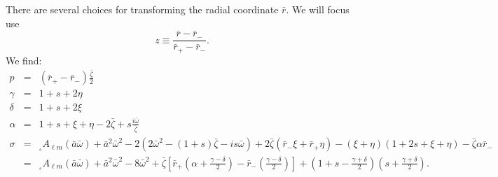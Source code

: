\documentclass[11pt]{article}
\newcommand{\scA}[4][]{{}_{{}_{#2}}A^{#1}_{#3}(#4)}
\begin{document}
There are several choices for transforming the radial coordinate
$\bar{r}$.  We will focus use
\begin{equation}
z \equiv \frac{\bar{r}-\bar{r}_\minus}{\bar{r}_+-\bar{r}_\minus}.
\end{equation}
We find:
\begin{eqnarray}
  p &=& (\bar{r}_+-\bar{r}_\minus)\frac{\bar\zeta}2 \\
  \gamma &=& 1+s+2\eta \\
  \delta &=& 1+s+2\xi \\
  \alpha &=& 1+s+\xi+\eta - 2\bar\zeta + s\frac{i\bar\omega}{\bar\zeta} \\
  \sigma &=& \scA{s}{\ell{m}}{\bar{a}\bar\omega} + \bar{a}^2\bar\omega^2 
   - 2\left(2\bar\omega^2-(1+s)\bar\zeta-is\bar\omega\right) 
   + 2\bar\zeta(\bar{r}_\minus\xi + \bar{r}_+\eta) - (\xi+\eta) (1+2s+\xi+\eta)
   -\bar\zeta\alpha\bar{r}_\minus \\
   &=& \scA{s}{\ell{m}}{\bar{a}\bar\omega} + \bar{a}^2\bar\omega^2 
   - 8\bar\omega^2 +\bar\zeta\left[
     \bar{r}_+\left(\alpha+\frac{\gamma-\delta}2\right)-
     \bar{r}_\minus\left(\frac{\gamma-\delta}2\right)\right]
   + \left(1+s-\frac{\gamma+\delta}2\right)\left(s+\frac{\gamma+\delta}2\right).
   \nonumber
\end{eqnarray}
\end{document}
